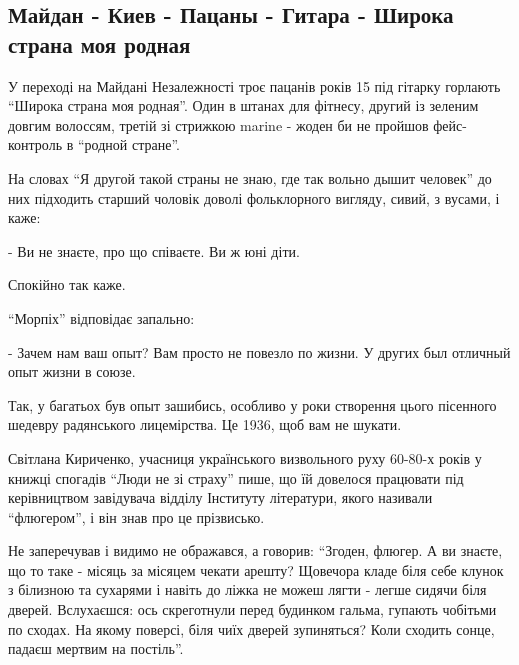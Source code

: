  
 
 
 
 

\subsection{Майдан - Киев - Пацаны - Гитара - Широка страна моя родная}

У переході на Майдані Незалежності троє пацанів років 15 під гітарку  горлають
\enquote{Широка страна моя родная}. Один в штанах для фітнесу, другий із зеленим довгим
волоссям, третій зі стрижкою marine - жоден би не пройшов фейс-контроль в
\enquote{родной стране}.

На словах \enquote{Я другой такой страны не знаю, где так вольно дышит человек} до них
підходить старший чоловік доволі фольклорного вигляду, сивий, з вусами, і каже:

- Ви не знаєте, про що співаєте.  Ви ж юні діти.

Спокійно так каже. 

\enquote{Морпіх} відповідає запально:

- Зачем нам ваш опыт? Вам просто не повезло по жизни. У других был отличный опыт жизни в союзе.  

Так, у багатьох був опыт зашибись, особливо у роки створення цього пісенного
шедевру радянського лицемірства. Це 1936, щоб вам не шукати.

Світлана Кириченко, учасниця українського визвольного руху 60-80-х років у
книжці спогадів \enquote{Люди не зі страху} пише, що їй  довелося працювати під
керівництвом завідувача відділу Інституту літератури,  якого називали
\enquote{флюгером}, і він знав про це прізвисько. 

Не заперечував і видимо не ображався, а говорив: \enquote{Згоден, флюгер. А ви знаєте,
що то таке - місяць за місяцем чекати арешту? Щовечора кладе біля себе клунок з
білизною та сухарями і навіть до ліжка не можеш лягти - легше сидячи біля
дверей. Вслухаєшся: ось скреготнули перед будинком гальма, гупають  чобітьми по
сходах. На якому поверсі, біля чиїх дверей зупиняться? Коли сходить сонце,
падаєш мертвим на постіль}.

